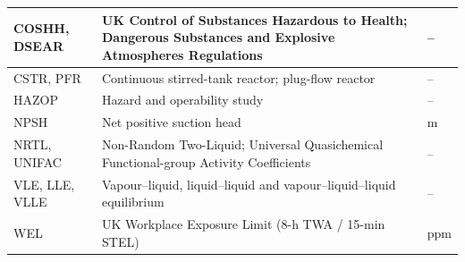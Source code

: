 \documentclass[10pt,a4paper]{article}
\begin{document}
\begin{table}[H]
\begin{tabularx}{\textwidth}{|C{3.3cm}|Z|C{4.3cm}|}
\hline
COSHH, DSEAR & UK Control of Substances Hazardous to Health; Dangerous Substances and Explosive Atmospheres Regulations & -- \\
\hline
CSTR, PFR & Continuous stirred-tank reactor; plug-flow reactor & -- \\
\hline
HAZOP & Hazard and operability study & -- \\
\hline
NPSH & Net positive suction head & m \\
\hline
NRTL, UNIFAC & Non-Random Two-Liquid; Universal Quasichemical Functional-group Activity Coefficients & -- \\
\hline
VLE, LLE, VLLE & Vapour--liquid, liquid--liquid and vapour--liquid--liquid equilibrium & -- \\
\hline
WEL & UK Workplace Exposure Limit (8-h TWA / 15-min STEL) & ppm \\
\hline
\end{tabularx}
\end{table}
\clearpage
\end{document}
